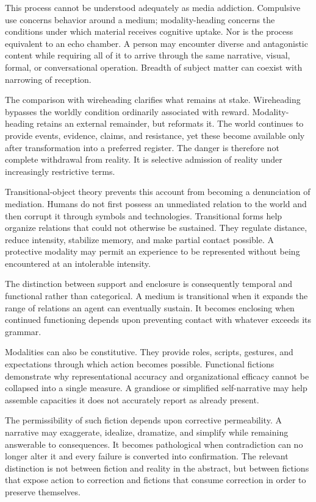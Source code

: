 \documentclass[11pt]{article}
\begin{document}
This process cannot be understood adequately as media addiction. Compulsive
use concerns behavior around a medium; modality-heading concerns the
conditions under which material receives cognitive uptake. Nor is the process
equivalent to an echo chamber. A person may encounter diverse and antagonistic
content while requiring all of it to arrive through the same narrative,
visual, formal, or conversational operation. Breadth of subject matter can
coexist with narrowing of reception.

The comparison with wireheading clarifies what remains at stake. Wireheading
bypasses the worldly condition ordinarily associated with reward.
Modality-heading retains an external remainder, but reformats it. The world
continues to provide events, evidence, claims, and resistance, yet these become
available only after transformation into a preferred register. The danger is
therefore not complete withdrawal from reality. It is selective admission of
reality under increasingly restrictive terms.

Transitional-object theory prevents this account from becoming a denunciation
of mediation. Humans do not first possess an unmediated relation to the world
and then corrupt it through symbols and technologies. Transitional forms help
organize relations that could not otherwise be sustained. They regulate
distance, reduce intensity, stabilize memory, and make partial contact
possible. A protective modality may permit an experience to be represented
without being encountered at an intolerable intensity.

The distinction between support and enclosure is consequently temporal and
functional rather than categorical. A medium is transitional when it expands
the range of relations an agent can eventually sustain. It becomes enclosing
when continued functioning depends upon preventing contact with whatever
exceeds its grammar.

Modalities can also be constitutive. They provide roles, scripts, gestures,
and expectations through which action becomes possible. Functional fictions
demonstrate why representational accuracy and organizational efficacy cannot
be collapsed into a single measure. A grandiose or simplified self-narrative
may help assemble capacities it does not accurately report as already
present.

The permissibility of such fiction depends upon corrective permeability. A
narrative may exaggerate, idealize, dramatize, and simplify while remaining
answerable to consequences. It becomes pathological when contradiction can no
longer alter it and every failure is converted into confirmation. The
relevant distinction is not between fiction and reality in the abstract, but
between fictions that expose action to correction and fictions that consume
correction in order to preserve themselves.
\end{document}
